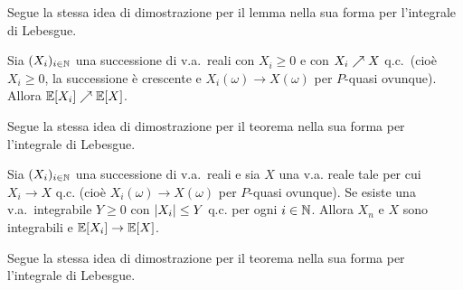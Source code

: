 \begin{multicols*}{2}
\begin{lemma}[di Fatou]
    Segue la stessa idea di dimostrazione per il lemma nella sua forma per l'integrale di Lebesgue.
\end{lemma}

\begin{theorem}
    Sia $(X_i)_{i \in \mathbb{N}}$ una successione di v.a.~reali con $X_i \geq 0$ e con
    $X_i \nearrow X$ q.c.~(cioè $X_i \geq 0$, la successione è crescente e
    $X_i(\omega) \to X(\omega)$ per $P$-quasi ovunque). Allora $\mathbb{E}[X_i] \nearrow \mathbb{E}[X]$. \smallskip


    Segue la stessa idea di dimostrazione per il teorema nella sua forma per l'integrale di Lebesgue.
\end{theorem}

\begin{theorem}
    Sia $(X_i)_{i \in \mathbb{N}}$ una successione di v.a.~reali e sia $X$ una v.a. reale tale per cui
    $X_i \to X$ q.c. (cioè $X_i(\omega) \to X(\omega)$ per $P$-quasi ovunque). Se esiste una
    v.a.~integrabile $Y \geq 0$ con $\left\lvert X_i \right\rvert \leq Y$ q.c. per ogni $i \in \mathbb{N}$. Allora $X_n$ e
    $X$ sono integrabili e $\mathbb{E}[X_i] \to \mathbb{E}[X]$. \smallskip


    Segue la stessa idea di dimostrazione per il teorema nella sua forma per l'integrale di Lebesgue.
\end{theorem}

\end{multicols*}